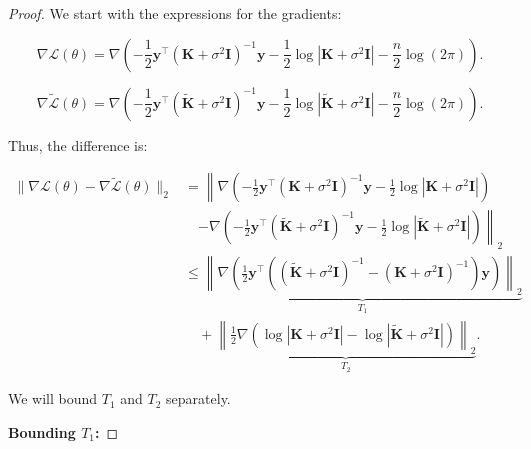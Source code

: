 \begin{proof}
    We start with the expressions for the gradients:

$$
\nabla \mathcal{L}(\theta) = \nabla \left( -\frac{1}{2} \mathbf{y}^\top (\mathbf{K} + \sigma^2 \mathbf{I})^{-1} \mathbf{y} - \frac{1}{2} \log |\mathbf{K} + \sigma^2 \mathbf{I}| - \frac{n}{2} \log(2\pi) \right).
$$

$$
\nabla \tilde{\mathcal{L}}(\theta) = \nabla \left( -\frac{1}{2} \mathbf{y}^\top (\tilde{\mathbf{K}} + \sigma^2 \mathbf{I})^{-1} \mathbf{y} - \frac{1}{2} \log |\tilde{\mathbf{K}} + \sigma^2 \mathbf{I}| - \frac{n}{2} \log(2\pi) \right).
$$

Thus, the difference is:

\begin{align*}
\| \nabla \mathcal{L}(\theta) - \nabla \tilde{\mathcal{L}}(\theta) \|_2 &= \left\| \nabla \left( -\frac{1}{2} \mathbf{y}^\top (\mathbf{K} + \sigma^2 \mathbf{I})^{-1} \mathbf{y} - \frac{1}{2} \log |\mathbf{K} + \sigma^2 \mathbf{I}| \right) \right. \\
&\quad \left. - \nabla \left( -\frac{1}{2} \mathbf{y}^\top (\tilde{\mathbf{K}} + \sigma^2 \mathbf{I})^{-1} \mathbf{y} - \frac{1}{2} \log |\tilde{\mathbf{K}} + \sigma^2 \mathbf{I}| \right) \right\|_2 \\
&\leq \underbrace{\left\| \nabla \left( \frac{1}{2} \mathbf{y}^\top \left( (\tilde{\mathbf{K}} + \sigma^2 \mathbf{I})^{-1} - (\mathbf{K} + \sigma^2 \mathbf{I})^{-1} \right) \mathbf{y} \right) \right\|_2}_{T_1} \\
&\quad + \underbrace{\left\| \frac{1}{2} \nabla \left( \log |\mathbf{K} + \sigma^2 \mathbf{I}| - \log |\tilde{\mathbf{K}} + \sigma^2 \mathbf{I}| \right) \right\|_2}_{T_2}.
\end{align*}

We will bound $T_1$ and $T_2$ separately.

\textbf{Bounding $T_1$:}




\end{proof}

